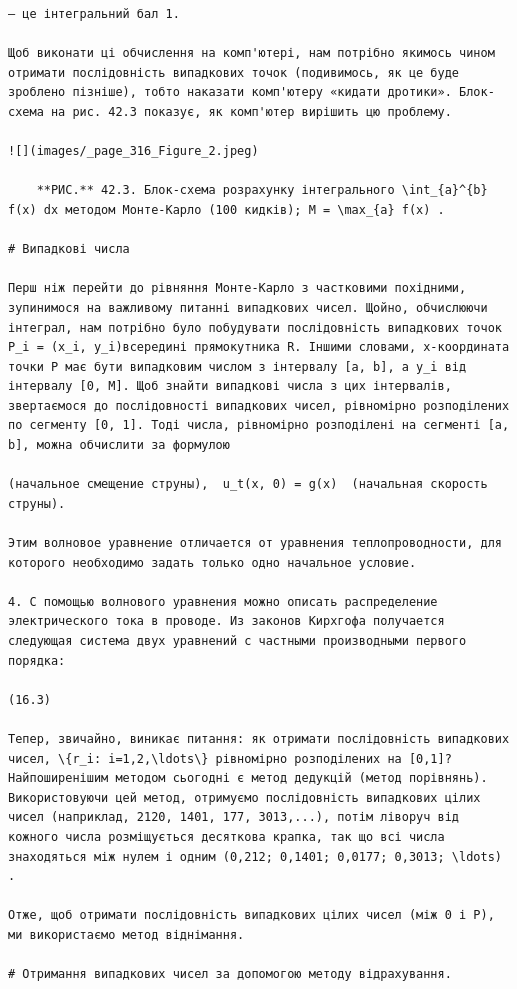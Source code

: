 \documentclass[
  ukrainian,
]{article}
\begin{document}
\begin{verbatim}
— це інтегральний бал 1.

Щоб виконати ці обчислення на комп'ютері, нам потрібно якимось чином отримати послідовність випадкових точок (подивимось, як це буде зроблено пізніше), тобто наказати комп'ютеру «кидати дротики». Блок-схема на рис. 42.3 показує, як комп'ютер вирішить цю проблему.

![](images/_page_316_Figure_2.jpeg)

    **РИС.** 42.3. Блок-схема розрахунку інтегрального \int_{a}^{b} f(x) dx методом Монте-Карло (100 кидків); M = \max_{a} f(x) .

# Випадкові числа

Перш ніж перейти до рівняння Монте-Карло з частковими похідними, зупинимося на важливому питанні випадкових чисел. Щойно, обчислюючи інтеграл, нам потрібно було побудувати послідовність випадкових точок P_i = (x_i, y_i)всередині прямокутника R. Іншими словами, x-координата точки P має бути випадковим числом з інтервалу [a, b], а y_i від інтервалу [0, M]. Щоб знайти випадкові числа з цих інтервалів, звертаємося до послідовності випадкових чисел, рівномірно розподілених по сегменту [0, 1]. Тоді числа, рівномірно розподілені на сегменті [a, b], можна обчислити за формулою

(начальное смещение струны),  u_t(x, 0) = g(x)  (начальная скорость струны).

Этим волновое уравнение отличается от уравнения теплопроводности, для которого необходимо задать только одно начальное условие.

4. С помощью волнового уравнения можно описать распределение электрического тока в проводе. Из законов Кирхгофа получается следующая система двух уравнений с частными производными первого порядка:

(16.3)

Тепер, звичайно, виникає питання: як отримати послідовність випадкових чисел, \{r_i: i=1,2,\ldots\} рівномірно розподілених на [0,1]? Найпоширенішим методом сьогодні є метод дедукцій (метод порівнянь). Використовуючи цей метод, отримуємо послідовність випадкових цілих чисел (наприклад, 2120, 1401, 177, 3013,...), потім ліворуч від кожного числа розміщується десяткова крапка, так що всі числа знаходяться між нулем і одним (0,212; 0,1401; 0,0177; 0,3013; \ldots) .

Отже, щоб отримати послідовність випадкових цілих чисел (між 0 і P), ми використаємо метод віднімання.

# Отримання випадкових чисел за допомогою методу відрахування.


\end{verbatim}
\end{document}
